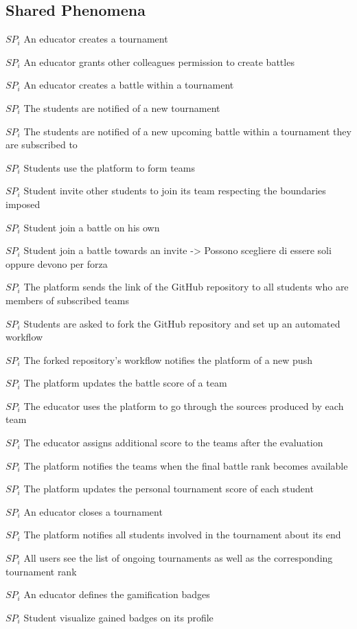 \subsection{Shared Phenomena}
\begin{description}
    \item \(SP_i\) An educator creates a tournament
    \item \(SP_i\) An educator grants other colleagues permission to create battles
    \item \(SP_i\) An educator creates a battle within a tournament
    \item \(SP_i\) The students are notified of a new tournament
    \item \(SP_i\) The students are notified of a new upcoming battle within a tournament they are subscribed to
    \item \(SP_i\) Students use the platform to form teams
    \item \(SP_i\) Student invite other students to join its team respecting the boundaries imposed
    \item \(SP_i\) Student join a battle on his own
    \item \(SP_i\) Student join a battle towards an invite -> Possono scegliere di essere soli oppure devono per forza
    \item \(SP_i\) The platform sends the link of the GitHub repository to all students who are members of subscribed teams
    \item \(SP_i\) Students are asked to fork the GitHub repository and set up an automated workflow
    \item \(SP_i\) The forked repository's workflow notifies the platform of a new push
    \item \(SP_i\) The platform updates the battle score of a team
    \item \(SP_i\) The educator uses the platform to go through the sources produced by each team
    \item \(SP_i\) The educator assigns additional score to the teams after the evaluation
    \item \(SP_i\) The platform notifies the teams when the final battle rank becomes available
    \item \(SP_i\) The platform updates the personal tournament score of each student
    \item \(SP_i\) An educator closes a tournament
    \item \(SP_i\) The platform notifies all students involved in the tournament about its end
    \item \(SP_i\) All users see the list of  ongoing tournaments as well as the corresponding tournament rank
    \item \(SP_i\) An educator defines the gamification badges
    \item \(SP_i\) Student visualize gained badges on its profile
\end{description}

